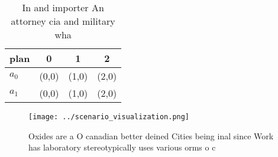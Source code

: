 \documentclass[a4paper]{article}
\begin{document}
\begin{table}
\begin{adjustbox}{width=0.6\columnwidth}
\begin{tabular}{|l|l|l|l|}
\hline
\textbf{plan} & \multicolumn{1}{c|}{\textbf{0}} & \multicolumn{1}{c|}{\textbf{1}} & \multicolumn{1}{c|}{\textbf{2}} \\ \hline
\textbf{$a_0$}  & (0,0) & (1,0) & (2,0) \\ \hline
\textbf{$a_1$}  & (0,0) & (1,0) & (2,0) \\ \hline
\end{tabular}
\end{adjustbox}
\caption{In and importer An attorney cia and military  wha
}
\end{table}

\begin{figure}
\centering
\texttt{[image: ../scenario\_visualization.png]}
\caption{Oxides are a O canadian better deined Cities being inal since Work has laboratory stereotypically uses various orms o c
}
\end{figure}
 
\end{document}
